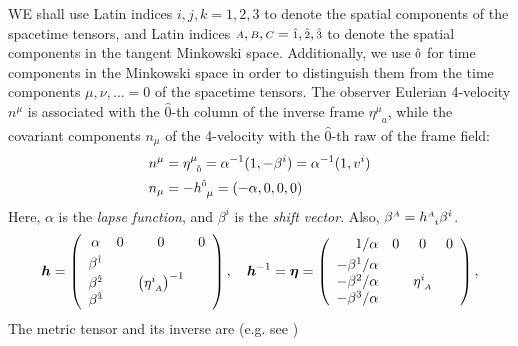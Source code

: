 \documentclass[
10pt, %
a4paper, %
oneside, %
headinclude,footinclude, %
BCOR5mm, %
]{scrartcl}
\newcommand{\sA}{\mathsmaller A}
\newcommand{\sB}{\mathsmaller B}
\newcommand{\sC}{\mathsmaller C}
\newcommand{\tetrsymbol}{h}
\newcommand{\itetrsymbol}{\eta}
\newcommand{\itetr}[2]{\itetrsymbol^{#1}_{\phantom{#1}#2}}
\newcommand{\tetr}[2]{\tetrsymbol^{#1}_{\phantom{#1}#2}}
\newcommand{\indalg}[1]{\hat{\mathsmaller{#1}}}
\newcommand{\lapse}{\alpha}
\newcommand{\shift}[1]{\beta^{#1}}
\begin{document}
WE shall use Latin indices $ i,j,k=1,2,3 $ to denote the spatial components of the spacetime 
tensors, and Latin indices $ \sA,\sB,\sC = \indalg{1},\indalg{2},\indalg{3} $ to denote the spatial 
components in the tangent Minkowski space. Additionally, we use $ \indalg{0} $ for time components 
in the Minkowski space in order to distinguish them from the time components $ \mu,\nu,\ldots
=0 $ of the spacetime tensors.  The observer Eulerian 4-velocity 
$ 
n^\mu $ is associated with the $ \hat{0} $-th column of the 
inverse frame $ \itetr{\mu}{a} $, while the covariant components $ n_\mu $ of the 4-velocity with 
the $ 
\hat{0} $-th raw of the frame field:
\begin{subequations}\label{eq.4vel}
	\begin{align}
		n^{\mu} &= \itetr{\mu}{\indalg{0}}  = \lapse^{-1}(1,-\shift{i}) = \lapse^{-1}(1,v^i)\\
		n_\mu   &= - \tetr{\indalg{0}}{\mu} = (-\lapse,0,0,0) 
	\end{align}
\end{subequations}
Here, $ \lapse $ is the \emph{lapse function}, and $ \shift{i} $ is the \emph{shift vector}. Also, 
$ \beta^{\sA} = \tetr{\sA}{i}\beta^i$.
\begin{equation}
	\bm{\tetrsymbol} = \left(
	\begin{array}{cccc}
		\alpha          & 0 & 0 & 0 \\[1mm]
		\beta^{\indalg{1}} &  &  &  \\
		\beta^{\indalg{2}} &  & \left (\itetr{i}{\sA}\right )^{-1} &  \\
		\beta^{\indalg{3}} &  &  & 
	\end{array}
	\right) ,
	\quad
	\bm{h}^{-1} = \bm{\itetrsymbol} = \left(
	\begin{array}{rlcl}
		1/\alpha          & 0 & 0 & 0 \\[1mm]
		-\beta^{1}/\alpha &  &  &  \\
		-\beta^{2}/\alpha &  & \itetr{i}{\sA} &  \\
		-\beta^{3}/\alpha &  &  & 
	\end{array}
	\right) ,
\end{equation}
The metric tensor and its inverse are (e.g. see \cite{Gourgoulhon2012a})
\end{document}
